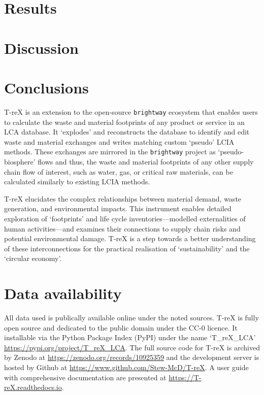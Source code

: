 \documentclass[review,3p,authoryear]{elsarticle}
\renewcommand{\texttt}[1]{{\ttfamily\small\nolinkurl{#1}}}
\begin{document}
\section{Results}\label{sec:results}


\section{Discussion}\label{sec:discussion}


\section{Conclusions}\label{sec:conclusions}

T-reX is an extension to the open-source \texttt{brightway} ecosystem that enables users to calculate the waste and material footprints of any product or service in an LCA database. It `explodes' and reconstructs the database to identify and edit waste and material exchanges and writes matching custom `pseudo' LCIA methods. These exchanges are mirrored in the \texttt{brightway} project as `pseudo-biosphere' flows and thus, the waste and material footprints of any other supply chain flow of interest, such as water, gas, or critical raw materials, can be calculated similarly to existing LCIA methods.

T-reX elucidates the complex relationships between material demand, waste generation, and environmental impacts. This instrument enables detailed exploration of `footprints' and life cycle inventories---modelled externalities of human activities---and examines their connections to supply chain risks and potential environmental damage. T-reX is a step towards a better understanding of these interconnections for the practical realisation of `sustainability' and the `circular economy'.

\section*{Data availability}
All data used is publically available online under the noted sources. T-reX is fully open source and dedicated to the public domain under the CC-0 licence. It installable via the Python Package Index (PyPI) under the name `T\_reX\_LCA' \url{https://pypi.org/project/T_reX_LCA}.
The full source code for T-reX is archived by Zenodo at \url{https://zenodo.org/records/10925359} and the development server is hosted by Github at \url{https://www.github.com/Stew-McD/T-reX}. A user guide with comprehensive documentation are presented at \url{https://T-reX.readthedocs.io}.
\end{document}
